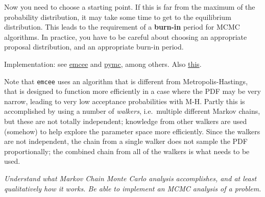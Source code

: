 \documentclass{article}
\newcommand{\test}[1]{%
    \begin{center}
        \colorbox{hl}{\parbox{0.9\textwidth}{\emph{\centering #1}}}
    \end{center}}
\begin{document}
Now you need to choose a starting point. If this is far from the
maximum of the probability distribution, it may take some time to get to the
equilibrium distribution. This leads to the requirement of a \textbf{burn-in}
period for MCMC algorithms. In practice, you have to be careful about choosing
an appropriate proposal distribution, and an appropriate burn-in period.

Implementation: see \href{http://dan.iel.fm/emcee/current/}
{emcee} and \href{https://pymc-devs.github.io/pymc/}
{pymc}, among others. Also
\href{http://jakevdp.github.io/blog/2014/06/14/frequentism-and-bayesianism-4-bayesian-in-python/}
{this}.

Note that \texttt{emcee} uses an algorithm that is different from
Metropolis-Hastings, that is designed to function more efficiently in a case
where the PDF may be very narrow, leading to very low acceptance probabilities
with M-H. Partly this is accomplished by using a number of \textit{walkers},
i.e.\ multiple different Markov chains, but these are not totally independent;
knowledge from other walkers are used (somehow) to help explore the parameter
space more efficiently. Since the walkers are not independent, the chain from a
single walker does not sample the PDF proportionally; the combined chain from
all of the walkers is what needs to be used.

\test{Understand what Markov Chain Monte Carlo analysis accomplishes, and at
least qualitatively how it works. Be able to implement an MCMC analysis of
a problem.}
\end{document}
